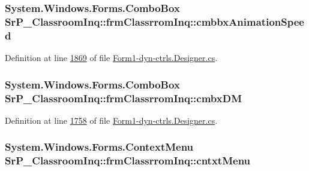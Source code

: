 \hypertarget{class_sr_p___classroom_inq_1_1frm_classrrom_inq_a23b040624768af2dd1a9417f5ba031d3}{
\subsubsection[{cmbbx\-Animation\-Speed}]{\setlength{\rightskip}{0pt plus 5cm}\-System.\-Windows.\-Forms.\-Combo\-Box {\bf \-Sr\-P\-\_\-\-Classroom\-Inq\-::frm\-Classrrom\-Inq\-::cmbbx\-Animation\-Speed}}}
\label{class_sr_p___classroom_inq_1_1frm_classrrom_inq_a23b040624768af2dd1a9417f5ba031d3}


\-Definition at line \hyperlink{_form1-dyn-ctrls_8_designer_8cs_source_l01869}{1869} of file \hyperlink{_form1-dyn-ctrls_8_designer_8cs_source}{\-Form1-\/dyn-\/ctrls.\-Designer.\-cs}.

\hypertarget{class_sr_p___classroom_inq_1_1frm_classrrom_inq_a3d1c3cd1ef0f02e6e927a4fd741672e5}{
\subsubsection[{cmbx\-D\-M}]{\setlength{\rightskip}{0pt plus 5cm}\-System.\-Windows.\-Forms.\-Combo\-Box {\bf \-Sr\-P\-\_\-\-Classroom\-Inq\-::frm\-Classrrom\-Inq\-::cmbx\-D\-M}}}
\label{class_sr_p___classroom_inq_1_1frm_classrrom_inq_a3d1c3cd1ef0f02e6e927a4fd741672e5}


\-Definition at line \hyperlink{_form1-dyn-ctrls_8_designer_8cs_source_l01758}{1758} of file \hyperlink{_form1-dyn-ctrls_8_designer_8cs_source}{\-Form1-\/dyn-\/ctrls.\-Designer.\-cs}.

\hypertarget{class_sr_p___classroom_inq_1_1frm_classrrom_inq_a7fb167457515aba637054c47a301188e}{
\subsubsection[{cntxt\-Menu}]{\setlength{\rightskip}{0pt plus 5cm}\-System.\-Windows.\-Forms.\-Context\-Menu {\bf \-Sr\-P\-\_\-\-Classroom\-Inq\-::frm\-Classrrom\-Inq\-::cntxt\-Menu}}}
\label{class_sr_p___classroom_inq_1_1frm_classrrom_inq_a7fb167457515aba637054c47a301188e}


